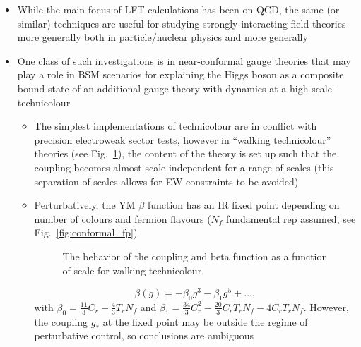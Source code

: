 \newpage



\begin{itemize}
    \item While the main focus of LFT calculations has been on QCD, the same (or similar) techniques are useful for studying strongly-interacting field theories more generally both in particle/nuclear physics and more generally
    \item One class of such investigations is in near-conformal gauge theories that may play a role in BSM scenarios for explaining the Higgs boson as a composite bound state of an additional gauge theory with dynamics at a high scale - technicolour
    \begin{itemize}
        \item The simplest implementations of technicolour are in conflict with precision electroweak sector tests, however in ``walking technicolour'' theories (see Fig.~\ref{fig:walking}), the content of the theory is set up such that the coupling becomes almost scale independent for a range of scales (this separation of scales allows for EW constraints to be avoided)
        \item Perturbatively, the YM $\beta$ function has an IR fixed point depending on number of colours and fermion flavours ($N_f$ fundamental rep assumed, see Fig.~\ref{fig:conformal_fp})
\begin{figure}
\begin{subfigure}{0.4\textwidth}
\end{subfigure}
\begin{subfigure}{0.4\textwidth}
\end{subfigure}
\caption{The behavior of the coupling and beta function as a function of scale for walking technicolour.
\label{fig:walking}}
\end{figure}
\begin{equation}
    \beta(g) = -\beta_0 g^3 - \beta_1 g^5 + \ldots,
\end{equation}
with $\beta_0 = \frac{11}{3}C_r - \frac{4}{3} T_r N_f$ and $\beta_1 = \frac{34}{3}C_r^2 - \frac{20}{3} C_r T_r N_f - 4 C_r T_r N_f$. However, the coupling $g_*$ at the fixed point may be outside the regime of perturbative control, so conclusions are ambiguous
    \end{itemize}


\end{itemize}
